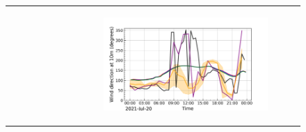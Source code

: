 \begin{figure}[hbtp]
\begin{tabular}{cc}
\begin{subfigure}[t]{0.5\textwidth}
        \end{subfigure} &
        \begin{subfigure}[t]{0.5\textwidth}
            \caption{}
            \includegraphics[width=\textwidth]{images/chap5/IOP_TS/TS_2021-07-20_cendrosa_wind_direction_10m.png}
        \end{subfigure} \\
    \end{tabular}
    \caption{}
    \label{fig:iop_days_TS_surfvars}
\end{figure}

